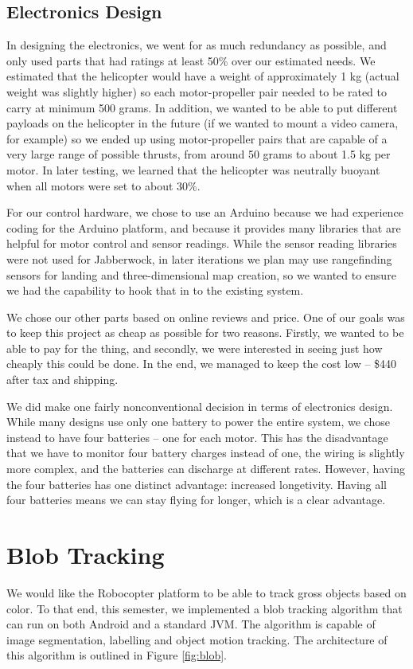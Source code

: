 \documentclass[letterpaper]{article}
\newcommand\figref[1]{Figure \ref{fig:#1}}
\begin{document}
\subsection{Electronics Design}
In designing the electronics, we went for as much redundancy as
possible, and only used parts that had ratings at least 50\% over our
estimated needs. We estimated that the helicopter would have a weight
of approximately 1 kg (actual weight was slightly higher) so each
motor-propeller pair needed to be rated to
carry at minimum 500 grams. In addition, we wanted to be able to put
different payloads on the helicopter in the future (if we wanted to
mount a video camera, for example) so we ended up using
motor-propeller pairs that are capable of a very large range of
possible thrusts, from around 50 grams to about 1.5 kg per motor. In
later testing, we learned that the helicopter was neutrally buoyant
when all motors were set to about 30\%.

For our control hardware, we chose to use an Arduino because we had
experience coding for the Arduino platform, and because it provides many
libraries that are helpful for motor control and sensor
readings. While the sensor reading libraries were not used for
Jabberwock, in later iterations we plan may use rangefinding sensors
for landing and three-dimensional map creation, so we wanted to ensure
we had the capability to hook that in to the existing system.

We chose our other parts based on online reviews and price. One of our
goals was to keep this project as cheap as possible for two reasons.
Firstly, we wanted to be able to pay for the thing, and secondly, we
were interested in seeing just how cheaply this could be done. In the
end, we managed to keep the cost low -- \$440 after tax and shipping.

We did make one fairly nonconventional decision in terms of
electronics design. While many designs use only one battery to power
the entire system, we chose instead to have four batteries -- one for
each motor. This has the disadvantage that we have to monitor four
battery charges instead of one, the wiring is slightly more complex,
and the batteries can discharge at different rates. However, having
the four batteries has one distinct advantage: increased
longetivity. Having all four batteries means we can stay flying for
longer, which is a clear advantage.

\section{Blob Tracking}
We would like the Robocopter platform to be able to track gross
objects based on color. To that end, this semester, we implemented a
blob tracking algorithm that can run on both Android and a standard
JVM. The algorithm is capable of image segmentation, labelling and
object motion tracking. The architecture of this algorithm is outlined
in \figref{blob}.
\end{document}
